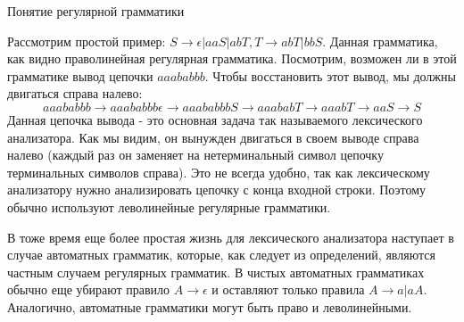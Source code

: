 \documentclass[12pt, pdf, hyperref={unicode},handout]{beamer}
\begin{document}
\begin{frame}{Понятие регулярной грамматики}
  \begin{block}

    \small{
      Рассмотрим простой пример: $S\rightarrow\epsilon|aaS|abT, T\rightarrow abT|bbS$. Данная грамматика, как видно праволинейная регулярная грамматика. Посмотрим, возможен ли в этой грамматике вывод цепочки $aaababbb$. Чтобы восстановить этот вывод, мы должны двигаться справа налево:
      $$aaababbb\rightarrow aaababbb\epsilon\rightarrow aaababbbS\rightarrow aaababT\rightarrow aaabT\rightarrow aaS\rightarrow S$$
      Данная цепочка вывода - это основная задача так называемого лексического анализатора. Как мы видим, он вынужден двигаться в своем выводе справа налево (каждый раз он заменяет на нетерминальный символ цепочку терминальных символов справа).
      Это не всегда удобно, так как лексическому анализатору нужно анализировать цепочку с конца входной строки. Поэтому обычно используют леволинейные регулярные грамматики.

      В тоже время еще более простая жизнь для лексического анализатора наступает в случае автоматных грамматик, которые, как следует из определений, являются частным случаем регулярных грамматик. В чистых автоматных грамматиках обычно еще убирают правило $A\rightarrow \epsilon$ и оставляют только правила $A\rightarrow a|aA$. Аналогично, автоматные грамматики могут быть право и леволинейными.

}

  \end{block}
  
\end{frame}
\end{document}
